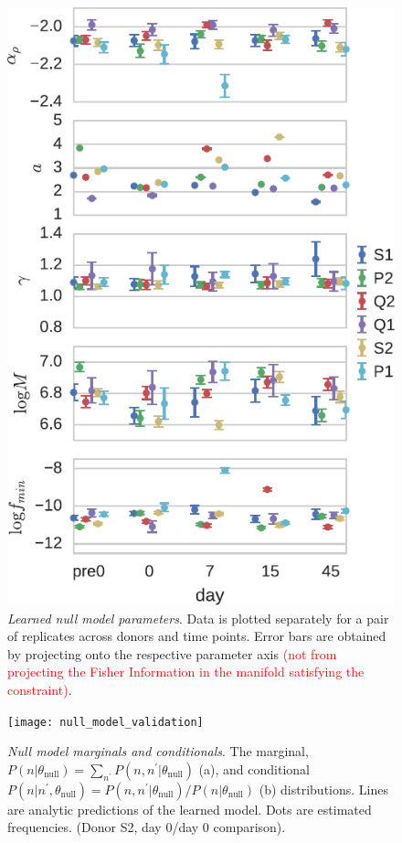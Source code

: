 \documentclass[letterpaper,english,prl,reprint,longbibliography]{revtex4-1} %
\newcommand{\re}[1]{\textcolor{red}{#1}}
\begin{document}
\begin{figure}[ht!]
\includegraphics{fig3_learnednullparas}
\centering{}
\caption{
\emph{Learned null model parameters}. Data is plotted separately for a pair of replicates across donors and time points. Error bars are obtained by projecting onto the respective parameter axis \re{(not from projecting the Fisher Information in the manifold satisfying the constraint)}. 
\label{fig:nullparas_timeseries}}
\end{figure}

\begin{figure}[ht!]
\texttt{[image: null\_model\_validation]}
\centering{}
\caption{
\emph{Null model marginals and conditionals}. The marginal, $P(n|\theta_{\textrm{null}})=\sum_{n^{\prime}}P(n,n^{\prime}|\theta_{\textrm{null}})$ (a), and conditional $P(n|n^{\prime},\theta_{\textrm{null}})=P(n,n^{\prime}|\theta_{\textrm{null}})/P(n|\theta_{\textrm{null}})$ (b) distributions. Lines are analytic predictions of the learned model. Dots are estimated frequencies. (Donor S2, day 0/day 0 comparison).
\label{fig:modelfit}}
\end{figure}
\end{document}
